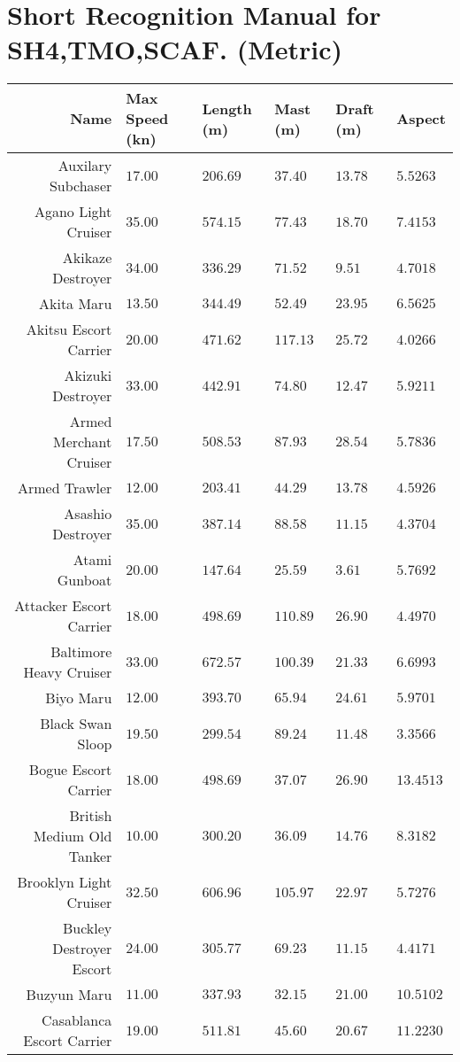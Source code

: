 \documentclass{article}
\begin{document}
\section{Short Recognition Manual for SH4,TMO,SCAF. (Metric)}
\centering
\begin{tabularx}{\textwidth}{|r|l|l|X|X|X|}
\hline
Name & Max Speed (kn) & Length (m) & Mast (m) & Draft (m) & Aspect\\
\hline
 Auxilary Subchaser & $17.00$ & $206.69$ & $37.40$ & $13.78$ & $5.5263$ \\
\hline
Agano Light Cruiser & $35.00$ & $574.15$ & $77.43$ & $18.70$ & $7.4153$ \\
\hline
Akikaze Destroyer & $34.00$ & $336.29$ & $71.52$ & $9.51$ & $4.7018$ \\
\hline
Akita Maru & $13.50$ & $344.49$ & $52.49$ & $23.95$ & $6.5625$ \\
\hline
Akitsu Escort Carrier & $20.00$ & $471.62$ & $117.13$ & $25.72$ & $4.0266$ \\
\hline
Akizuki Destroyer & $33.00$ & $442.91$ & $74.80$ & $12.47$ & $5.9211$ \\
\hline
Armed Merchant Cruiser & $17.50$ & $508.53$ & $87.93$ & $28.54$ & $5.7836$ \\
\hline
Armed Trawler & $12.00$ & $203.41$ & $44.29$ & $13.78$ & $4.5926$ \\
\hline
Asashio Destroyer & $35.00$ & $387.14$ & $88.58$ & $11.15$ & $4.3704$ \\
\hline
Atami Gunboat & $20.00$ & $147.64$ & $25.59$ & $3.61$ & $5.7692$ \\
\hline
Attacker Escort Carrier & $18.00$ & $498.69$ & $110.89$ & $26.90$ & $4.4970$ \\
\hline
Baltimore Heavy Cruiser & $33.00$ & $672.57$ & $100.39$ & $21.33$ & $6.6993$ \\
\hline
Biyo Maru & $12.00$ & $393.70$ & $65.94$ & $24.61$ & $5.9701$ \\
\hline
Black Swan Sloop & $19.50$ & $299.54$ & $89.24$ & $11.48$ & $3.3566$ \\
\hline
Bogue Escort Carrier & $18.00$ & $498.69$ & $37.07$ & $26.90$ & $13.4513$ \\
\hline
British Medium Old Tanker & $10.00$ & $300.20$ & $36.09$ & $14.76$ & $8.3182$ \\
\hline
Brooklyn Light Cruiser & $32.50$ & $606.96$ & $105.97$ & $22.97$ & $5.7276$ \\
\hline
Buckley Destroyer Escort & $24.00$ & $305.77$ & $69.23$ & $11.15$ & $4.4171$ \\
\hline
Buzyun Maru & $11.00$ & $337.93$ & $32.15$ & $21.00$ & $10.5102$ \\
\hline
Casablanca Escort Carrier & $19.00$ & $511.81$ & $45.60$ & $20.67$ & $11.2230$ \\
\hline
\end{tabularx}
\pagebreak
\end{document}
